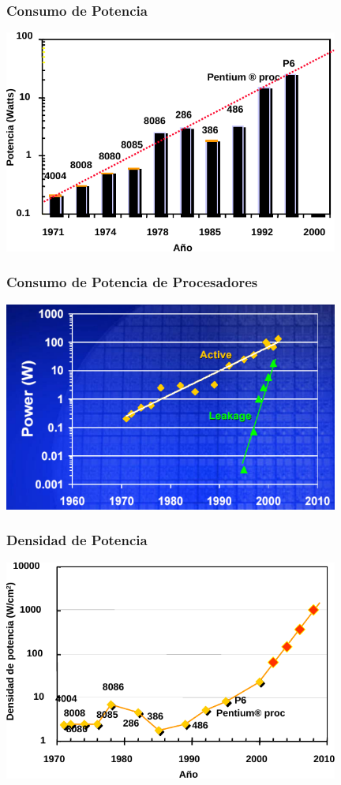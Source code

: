 \documentclass[t,aspectratio=169,10pt]{beamer}
\begin{document}
\begin{frame}
\frametitle{Consumo de Potencia}
\centering
\includegraphics[width=11cm]{power}
\end{frame}


\begin{frame}
\frametitle{Consumo de Potencia de Procesadores}
\centering
\includegraphics[width=11cm]{power2}
\end{frame}


\begin{frame}
\frametitle{Densidad de Potencia}
\centering
\includegraphics[width=11cm]{power3}
\end{frame}
\end{document}
